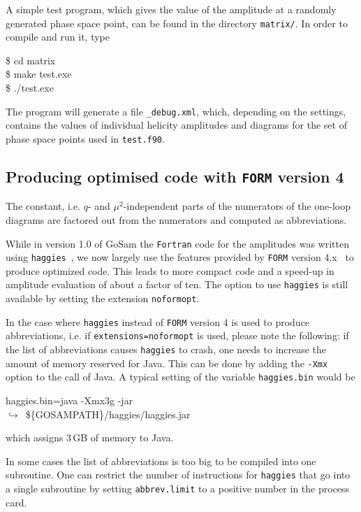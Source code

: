 \documentclass[11pt,a4paper]{refrep}
\newcommand{\gosam}{{\sc GoSam}\xspace}
\newcommand{\form}{{\tt FORM}\xspace}
\newcommand{\haggies}{{\tt haggies}\xspace}
\newcommand{\contl}{{\ensuremath{\hookrightarrow}}}
\begin{document}
A simple test program,
which gives the value of the amplitude at a randomly generated phase space point,
can be found in the directory \texttt{matrix/}.
In order to compile and run it, type
\begin{example}
\$ cd matrix\\
\$ make test.exe\\
\$ ./test.exe
\end{example}
The program will generate a file \texttt{\_debug.xml},
which, depending on the settings, contains the values of individual  helicity amplitudes
and diagrams for the set of phase space points used in {\tt test.f90}.


\subsection{Producing optimised code  with {\tt FORM} version 4}

The constant, i.e. $q$- and $\mu^2$-independent parts of the numerators
of the one-loop diagrams are factored out from the numerators and computed
as abbreviations. 

While in version 1.0 of \gosam{} the {\tt Fortran} code for the
amplitudes was written using \haggies~\cite{Reiter:2009ts}, we now
largely use the features provided by \form{} version
4.x~\cite{Kuipers:2012rf} to produce optimized code. This leads to more
compact code and a speed-up in amplitude evaluation of about a factor
of ten.  The option to use \haggies{} is still available by setting
the extension {\tt noformopt}.

In the case where \haggies{} instead of \form version 4 is used to produce abbreviations, 
i.e. if {\tt extensions=noformopt} is used, please note the  following:
if the list of abbreviations causes \haggies{}
to crash, one needs to increase the amount of memory reserved for Java.
This can be done by adding the \texttt{-Xmx} option to the call of Java.
A typical setting of the variable \texttt{haggies.bin} would be
\begin{example}
haggies.bin=java -Xmx3g -jar \\
\contl\ \$\{GOSAMPATH\}/haggies/haggies.jar
\end{example}
which assigns 3\,GB of memory to Java.

In some cases the list of abbreviations is too big to
be compiled into one subroutine. One can restrict the number of instructions for \haggies{}
that go into a single subroutine by setting \texttt{abbrev.limit} to a positive
number in the process card. 
\end{document}
